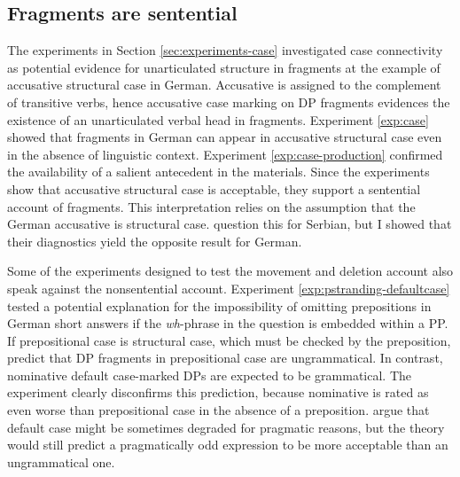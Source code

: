 \subsection{Fragments are sentential}
The experiments in Section \ref{sec:experiments-case} investigated case connectivity as potential evidence for unarticulated structure in fragments at the example of accusative structural case in German. Accusative is assigned to the complement of transitive verbs, hence accusative case marking on DP fragments evidences the existence of an unarticulated verbal head in fragments. 
Experiment \ref{exp:case} showed that fragments in German can appear in accusative structural case even in the absence of linguistic context. Experiment \ref{exp:case-production} confirmed the availability of a salient antecedent in the materials. Since the experiments show that accusative structural case is acceptable, they support a sentential account of fragments. This interpretation relies on the assumption that the German accusative is structural case. \citet{progovac.etal2006} question this for Serbian, but I showed that their diagnostics yield the opposite result for German. 

Some of the experiments designed to test the movement and deletion account also speak against the nonsentential account. Experiment \ref{exp:pstranding-defaultcase} tested a potential explanation for the impossibility of omitting prepositions in German short answers if the \textit{wh}-phrase in the question is embedded within a PP. If prepositional case is structural case, which must be checked by the preposition, \citet{barton.progovac2005} predict that DP fragments in prepositional case are ungrammatical. In contrast, nominative default case-marked DPs are expected to be grammatical. The experiment clearly disconfirms this prediction, because nominative is rated as even worse than prepositional case in the absence of a preposition. \citet{progovac.etal2006} argue that default case might be sometimes degraded for pragmatic reasons, but the theory would still predict a pragmatically odd expression to be more acceptable than an ungrammatical one.

